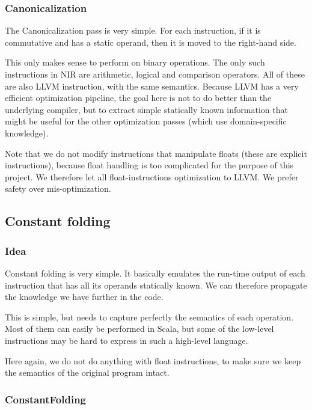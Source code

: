 \documentclass[11pt,a4paper]{article}
\newcommand{\scala}[1]{\textsf{#1}}
\begin{document}
\subsubsection*{Canonicalization}

The \scala{Canonicalization} pass is very simple. For each instruction, if it is commutative and has a static operand, then it is moved to the right-hand side.

This only makes sense to perform on binary operations. The only such instructions in NIR are arithmetic, logical and comparison operators. All of these are also LLVM instruction, with the same semantics. Because LLVM has a very efficient optimization pipeline, the goal here is not to do better than the underlying compiler, but to extract simple statically known information that might be useful for the other optimization passes (which use domain-specific knowledge).

Note that we do not modify instructions that manipulate floats (these are explicit instructions), because float handling is too complicated for the purpose of this project. We therefore let all float-instructions optimization to LLVM. We prefer safety over mis-optimization.

\subsection{Constant folding}

\subsubsection*{Idea}

Constant folding is very simple. It basically emulates the run-time output of each instruction that has all its operands statically known. We can therefore propagate the knowledge we have further in the code.

This is simple, but needs to capture perfectly the semantics of each operation. Most of them can easily be performed in Scala, but some of the low-level instructions may be hard to express in such a high-level language.

Here again, we do not do anything with float instructions, to make sure we keep the semantics of the original program intact.

\subsubsection*{ConstantFolding}
\end{document}
